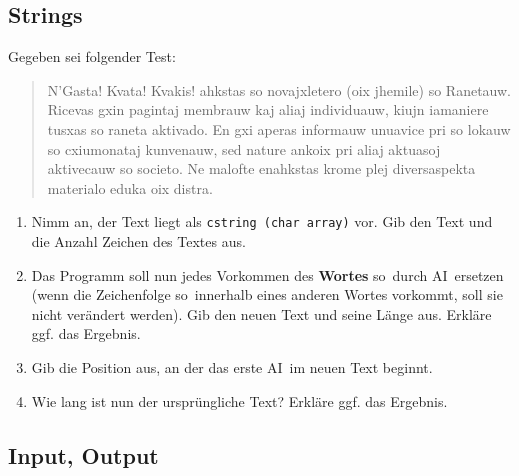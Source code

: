 \documentclass[11pt, a4paper]{article}
\begin{document}
\subsection{Strings}
Gegeben sei folgender Test:
\begin{quote}
	N'Gasta! Kvata! Kvakis! ahkstas so novajxletero (oix jhemile) so Ranetauw. Ricevas gxin pagintaj membrauw kaj aliaj individuauw, kiujn iamaniere tusxas so raneta aktivado. En gxi aperas informauw unuavice pri so lokauw so cxiumonataj kunvenauw, sed nature ankoix pri aliaj aktuasoj aktivecauw so societo. Ne malofte enahkstas krome plej diversaspekta materialo eduka oix distra.
\end{quote}
\begin{enumerate}
	\item Nimm an, der Text liegt als \texttt{cstring (char array)} vor. Gib den Text und die Anzahl Zeichen des Textes aus.
	\item Das Programm soll nun jedes Vorkommen des \textbf{Wortes} \glqq so\grqq\ durch \glqq AI\grqq\ ersetzen (wenn die Zeichenfolge \glqq so\grqq\ innerhalb eines anderen Wortes vorkommt, soll sie nicht verändert werden). Gib den neuen Text und seine Länge aus. Erkläre ggf. das Ergebnis.
	\item Gib die Position aus, an der das erste \glqq AI\grqq\ im neuen Text beginnt.
	\item Wie lang ist nun der ursprüngliche Text? Erkläre ggf. das Ergebnis.
\end{enumerate}


\subsection{Input, Output}
\end{document}
